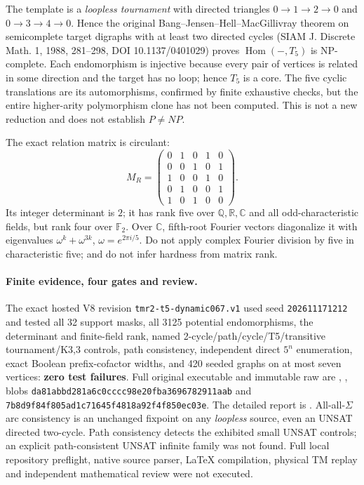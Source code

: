 \documentclass[11pt]{article}
\begin{document}
The template is a \emph{loopless tournament} with
directed triangles $0\to1\to2\to0$ and
$0\to3\to4\to0$. Hence the original
Bang--Jensen--Hell--MacGillivray theorem on
semicomplete target digraphs with at least two
directed cycles (SIAM J. Discrete Math. 1, 1988,
281--298, DOI 10.1137/0401029) proves
$\operatorname{Hom}(-,T_5)$ is NP-complete.
Each endomorphism is injective because every pair
of vertices is related in some direction and the
target has no loop; hence $T_5$ is a core. The
five cyclic translations are its automorphisms,
confirmed by finite exhaustive checks, but the
entire higher-arity polymorphism clone has not
been computed. This is not a new reduction and
does not establish $P\ne NP$.

The exact relation matrix is circulant:
\[
M_R=\begin{pmatrix}
0&1&0&1&0\\0&0&1&0&1\\
1&0&0&1&0\\0&1&0&0&1\\1&0&1&0&0
\end{pmatrix}.
\]
Its integer determinant is $2$; it has rank five
over $\mathbb Q,\mathbb R,\mathbb C$ and all
odd-characteristic fields, but rank four over
$\mathbb F_2$. Over $\mathbb C$, fifth-root
Fourier vectors diagonalize it with eigenvalues
$\omega^k+\omega^{3k}$,
$\omega=e^{2\pi i/5}$. Do not apply complex
Fourier division by five in characteristic five;
and do not infer hardness from matrix rank.

\paragraph{Finite evidence, four gates and review.}
The exact hosted V8 revision
\texttt{tmr2-t5-dynamic067.v1} used seed
\texttt{202611171212} and tested all 32 support
masks, all 3125 potential endomorphisms,
the determinant and finite-field rank,
named 2-cycle/path/cycle/T5/transitive
tournament/K3,3 controls, path consistency,
independent direct $5^n$ enumeration,
exact Boolean prefix-cofactor widths, and 420
seeded graphs on at most seven vertices:
\textbf{zero test failures}. Full original
executable and immutable raw are
,
,
blobs \texttt{da81abbd281a6c0cccc98e20fba3696782911aab}
and \texttt{7b8d9f84f805ad1c71645f4818a92f4f850ec03e}.
The detailed report is
.
All-all-$\Sigma$ arc consistency is an unchanged
fixpoint on any \emph{loopless} source, even
an UNSAT directed two-cycle. Path consistency
detects the exhibited small UNSAT controls;
an explicit path-consistent UNSAT infinite family
was not found. Full local repository preflight,
native source parser, LaTeX compilation, physical
TM replay and independent mathematical review
were not executed.
\end{document}
